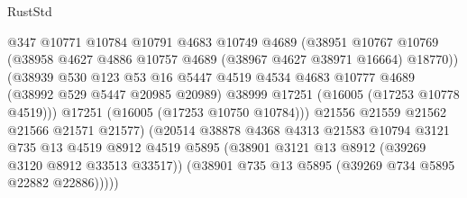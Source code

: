 \begin{lexlean}{RustStd}
\begin{coremodule}
                                      @347
                                      @10771
                                      @10784
                                      @10791
                                      @4683
                                      @10749
                                      @4689
                                      (@38951
                                        @10767
                                        @10769
                                        (@38958
                                          @4627
                                          @4886
                                          @10757
                                          @4689
                                          (@38967 @4627 @38971 @16664)
                                          @18770))
                                      (@38939
                                        @530
                                        @123
                                        @53
                                        @16
                                        @5447
                                        @4519
                                        @4534
                                        @4683
                                        @10777
                                        @4689
                                        (@38992 @529 @5447 @20985 @20989)
                                        @38999
                                        @17251
                                        (@16005 (@17253 @10778 @4519)))
                                      @17251
                                      (@16005 (@17253 @10750 @10784)))
                                    @21556
                                    @21559
                                    @21562
                                    @21566
                                    @21571
                                    @21577)
                                  (@20514
                                    @38878
                                    @4368
                                    @4313
                                    @21583
                                    @10794
                                    @3121
                                    @735
                                    @13
                                    @4519
                                    @8912
                                    @4519
                                    @5895
                                    (@38901 @3121 @13 @8912 (@39269 @3120 @8912 @33513 @33517))
                                    (@38901 @735 @13 @5895 (@39269 @734 @5895 @22882 @22886)))))

\end{coremodule}
\end{lexlean}
